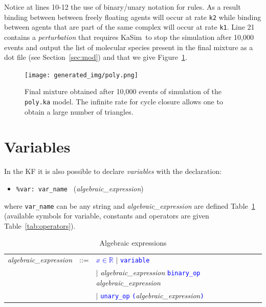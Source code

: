 \documentclass[11pt]{book}
\def\KaSim{\textsf{KaSim}}
\def\tcb#1{\textcolor{blue}{\ttt{#1}}}
\def\ttt#1{\texttt{#1}}
\def\var#1{{\textquotesingle}#1{\textquotesingle}}
\def\ITE#1{\begin{itemize}#1\end{itemize}}
\def\Real{\mathbb R}
\begin{document}
Notice at lines 10-12 the use of binary/unary notation for rules. As a result binding between between freely floating agents will occur at rate \ttt{{\textquotesingle}k2{\textquotesingle}} while binding between agents that are part of the same complex will occur at rate \ttt{{\textquotesingle}k1{\textquotesingle}}. Line 21 contains a \emph{perturbation} that requires \KaSim~to stop the simulation after 10,000 events and output the list of molecular species present in the final mixture as a dot file (see Section~\ref{sec:mod}) and that we give Figure~\ref{fig:species}.

\begin{figure}[htbp]
\begin{center}
\texttt{[image: generated\_img/poly.png]}
\caption{Final mixture obtained after 10,000 events of simulation of the \ttt{poly.ka} model. The infinite rate for cycle closure allows one to obtain a large number of triangles.}
\label{fig:species}
\end{center}
\end{figure}


\section{Variables}\label{sec:var}

In the KF it is also possible to declare \emph{variables} with the declaration:
\ITE{
\item[] \ttt{\%var: \var{var\_name}~} (\textit{algebraic\_expression})
}
where \ttt{var\_name} can be any string and \textit{algebraic\_expression} are defined Table~\ref{tab:alg} (available symbols for variable, constants and operators are given Table~\ref{tab:operators}).

\begin{table}[htbp]
  \centering
  \caption{Algebraic expressions}
  \begin{tabular}{@{} lcl @{}}
    \textit{algebraic\_expression} & ::= & \tcb{$x\in\Real$} $\mid$ \tcb{variable} \\
     &  & $\mid$ \textit{algebraic\_expression} \tcb{binary\_op} \textit{algebraic\_expression}\\
     &  & $\mid$ \tcb{unary\_op} \tcb{(}\textit{algebraic\_expression}\tcb{)} \\
    \end{tabular}
  \label{tab:alg}
\end{table}
\end{document}
